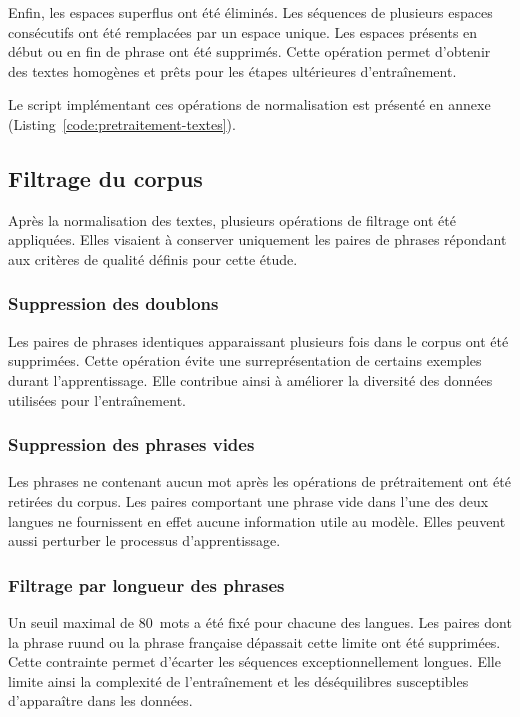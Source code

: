 Enfin, les espaces superflus ont été éliminés. Les séquences de plusieurs espaces consécutifs ont été remplacées par un espace unique. Les espaces présents en début ou en fin de phrase ont été supprimés. Cette opération permet d'obtenir des textes homogènes et prêts pour les étapes ultérieures d'entraînement.

Le script implémentant ces opérations de normalisation est présenté en annexe (Listing~\ref{code:pretraitement-textes}).

\subsection{Filtrage du corpus}

Après la normalisation des textes, plusieurs opérations de filtrage ont été appliquées. Elles visaient à conserver uniquement les paires de phrases répondant aux critères de qualité définis pour cette étude.

\subsubsection{Suppression des doublons}

Les paires de phrases identiques apparaissant plusieurs fois dans le corpus ont été supprimées. Cette opération évite une surreprésentation de certains exemples durant l'apprentissage. Elle contribue ainsi à améliorer la diversité des données utilisées pour l'entraînement.

\subsubsection{Suppression des phrases vides}

Les phrases ne contenant aucun mot après les opérations de prétraitement ont été retirées du corpus. Les paires comportant une phrase vide dans l'une des deux langues ne fournissent en effet aucune information utile au modèle. Elles peuvent aussi perturber le processus d'apprentissage.

\subsubsection{Filtrage par longueur des phrases}

Un seuil maximal de 80~mots a été fixé pour chacune des langues. Les paires dont la phrase ruund ou la phrase française dépassait cette limite ont été supprimées. Cette contrainte permet d'écarter les séquences exceptionnellement longues. Elle limite ainsi la complexité de l'entraînement et les déséquilibres susceptibles d'apparaître dans les données.

